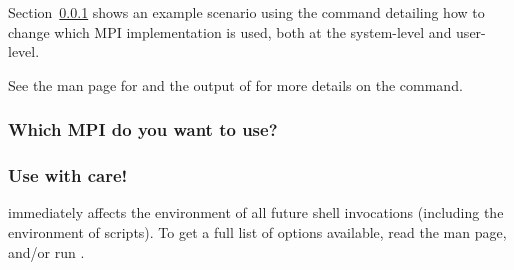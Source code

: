 Section~\ref{app:switcher-which-mpi-to-use} shows an example scenario
using the  command detailing how to change which MPI
implementation is used, both at the system-level and user-level.

See the man page for  and the output of  for more details on the  command.


\subsubsection{Which MPI do you want to use?}
\label{app:switcher-which-mpi-to-use}




\subsubsection{Use  with care!}

 immediately affects the environment of all future shell
invocations (including the environment of scripts).  To get a full
list of options available, read the  man page, and/or
run .
